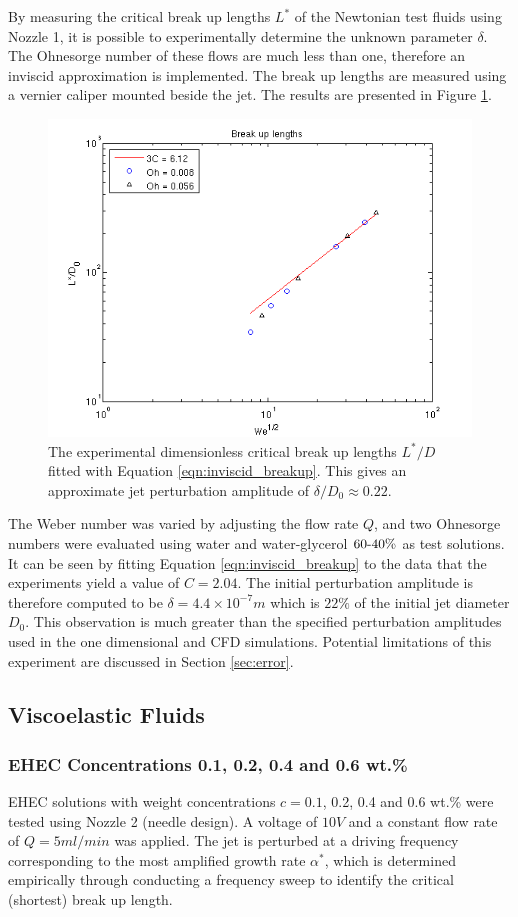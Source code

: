 \documentclass[11pt]{article}
\begin{document}
By measuring the critical break up lengths $L^*$ of the Newtonian test fluids 
using Nozzle 1, it is possible to experimentally determine the unknown 
parameter $\delta$. The Ohnesorge number of these flows are much less than one, 
therefore an inviscid approximation is implemented. The break up lengths are 
measured using a vernier caliper mounted beside the jet. The results are 
presented in Figure \ref{fig:breakup}.
\begin{figure}[h]
\centering
	\includegraphics[width = 0.5 \textwidth]{img/breakup.png}
	\caption{The experimental dimensionless critical break up lengths $L^*/D$ 
fitted with Equation \ref{eqn:inviscid_breakup}. This gives an approximate jet 
perturbation amplitude of $\delta/D_0 \approx 0.22$.}
	\label{fig:breakup}
\end{figure}

The Weber number was varied by adjusting the flow rate $Q$, and two Ohnesorge 
numbers were evaluated using water and water-glycerol $60 {\text -} 40 \%$ as 
test solutions. It can be seen by fitting Equation \ref{eqn:inviscid_breakup} 
to the data that the experiments yield a value of $C =2.04$. The initial 
perturbation amplitude is therefore computed to be $\delta = 4.4 \times 10^{-7} 
m$ which is $22\%$ of the initial jet diameter $D_0$. This observation is much 
greater than the specified perturbation amplitudes used in the one dimensional 
and CFD simulations. Potential limitations of this experiment are discussed in 
Section \ref{sec:error}. 

\subsection{Viscoelastic Fluids}

\subsubsection{EHEC Concentrations 0.1, 0.2, 0.4 and 0.6 wt.\%} \label{sec:EHEC}
EHEC solutions with weight concentrations $c=0.1$, 0.2, 0.4 and 0.6 wt.\% were 
tested using Nozzle 2 (needle design). A voltage of $10V$ and a constant flow 
rate of $Q = 5ml/min$ was applied. The jet is perturbed at a driving frequency 
corresponding to the most amplified growth rate $\alpha^*$, which is determined 
empirically through conducting a frequency sweep to identify the critical 
(shortest) break up length.
\end{document}

